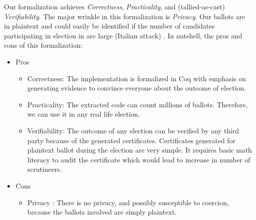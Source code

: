 

Our formalization achieves \textit{Correctness}, \textit{Practicality}, and 
(tallied-as-cast) \textit{Verifiability}. The major wrinkle in this formalization is \textit{Privacy}.  
Our ballots are in plaintext and could easily be identified
if the number of candidates participating in election in 
are large (Italian attack) \citep{Otten}.
\noindent
In nutshell, the pros and cons of this formalization:

\begin{itemize}
\item Pros 
\begin{itemize}
\item Correctness: The implementation is formalized in Coq with emphasis on generating 
         evidence to convince everyone about the outcome of election.
\item Practicality: The extracted code can count millions of ballots. Therefore, we can use it 
          in any real life election.
\item Verifiability: The outcome of any election can be verified by any third party because 
          of the generated certificates. Certificates generated for plaintext ballot 
		  during the election 
          are very simple.  It requires basic math literacy to audit the certificate which would 
          lead to increase in number of scrutineers. 

\end{itemize}
\item Cons
\begin{itemize}
\item Privacy : There is no privacy, and possibly susceptible to coercion, because the ballots involved 
         are simply plaintext. 
\end{itemize}
\end{itemize}

